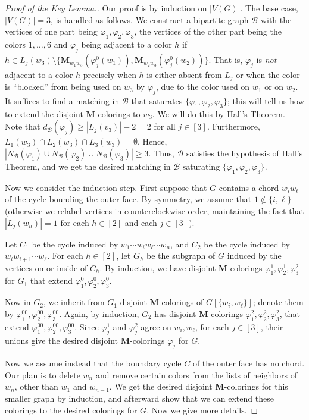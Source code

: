 \documentclass[11pt]{article}
\theoremstyle{definition}
\newcommand\vph{\varphi}
\renewcommand\ge{\geqslant}
\newcommand\B{\mathcal{B}}
\newcommand\MM{\textbf{M}}
\begin{document}
\begin{proof}[Proof of the Key Lemma.]
	Our proof is by induction on $|V(G)|$.  The base case, $|V(G)|=3$, is handled as follows.  We 
	construct a bipartite graph $\B$ with the vertices of one part being $\vph_1,\vph_2,\vph_3$,
	the vertices of the other part 
	being the colors $1,\ldots,6$ and $\vph_j$ being adjacent to a color $h$ if $h\in 
	L_j(w_3)\setminus\{\MM_{w_1w_3}(\vph^0_j(w_1)), \MM_{w_2w_3}(\vph_j^0(w_2))\}$.  
	That is, $\vph_j$ is \emph{not} adjacent to a color $h$ precisely when $h$ is either
	absent from $L_j$ or when the color is ``blocked'' from being used on $w_3$ by $\vph_j$, 
	due to the color used on $w_1$ or on $w_2$.  It suffices to find a matching in $\B$ that 
	saturates $\{\vph_1,\vph_2, \vph_3\}$; this will tell us how to extend the disjoint 
	$\MM$-colorings to $w_3$.  We will do this by Hall's Theorem.
	Note that $d_\B(\vph_j)\ge |L_j(v_3)|-2=2$ for all $j\in[3]$.  Furthermore, 
	$L_1(w_3)\cap L_2(w_3)\cap L_3(w_3)=\emptyset$.  Hence, 
	$|N_\B(\vph_1)\cup N_\B(\vph_2)\cup N_\B(\vph_3)|\ge 3$.  Thus, $\B$ satisfies the hypothesis of 
	Hall's Theorem, and we get the desired matching in $\B$ saturating $\{\vph_1,\vph_2,\vph_3\}$.

	Now we consider the induction step.  First suppose that $G$ contains a chord $w_iw_\ell$ of the cycle
	bounding the outer face.  By symmetry, we assume that $1\notin\{i,\ell\}$ (otherwise
	we relabel vertices in counterclockwise order, maintaining the fact 
	that $|L_j(w_h)|=1$ for each $h\in [2]$ and each $j\in[3]$).

	Let $C_1$ be the cycle induced by $w_1\cdots w_iw_\ell\cdots w_n$, and 
	$C_2$ be the cycle induced by $w_iw_{i+1}\cdots w_\ell$.  For each $h\in[2]$, let $G_h$ be the 
	subgraph of $G$ induced by the vertices on or inside of $C_h$.  By induction, we have disjoint
	$\MM$-colorings $\vph_1^1,\vph_2^1,\vph_3^2$ for $G_1$ that extend $\vph_1^0,\vph_2^0,\vph_3^0$.

	Now in $G_2$, we inherit from $G_1$ disjoint $\MM$-colorings of $G[\{w_i,w_{\ell}\}]$;
	denote them by $\vph_1^{00},\vph_2^{00},\vph_3^{00}$.
	Again, by induction, $G_2$ has disjoint $\MM$-colorings $\vph_1^2,\vph_2^2,\vph_3^2$, that
	extend $\vph_1^{00},\vph_2^{00},\vph_3^{00}$.
	Since $\vph_j^1$ and $\vph_j^2$ agree on $w_i,w_\ell$, for each $j\in[3]$, their unions give the 
	desired disjoint $\MM$-colorings $\vph_j$ for $G$.

	Now we assume instead that the boundary cycle $C$ of the outer face has no chord.
	Our plan is to delete $w_n$ and remove certain colors from the lists of neighbors of $w_n$, other
	than $w_1$ and $w_{n-1}$.  We get the desired disjoint $\MM$-colorings for this smaller graph by 
	induction, and afterward show that we can extend these colorings to the desired colorings for $G$.  
	Now we give more details.
	

\end{proof}
\end{document}
